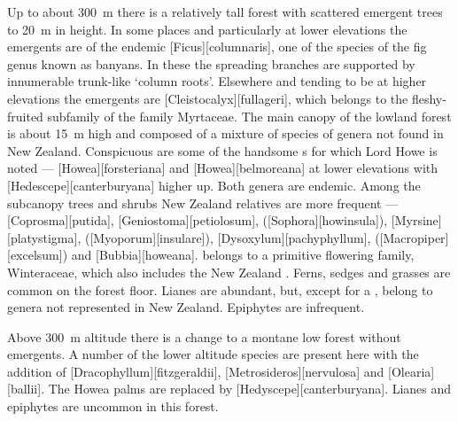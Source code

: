 Up to about \SI{300}{\metre} there is a relatively tall forest with scattered emergent trees to \SI{20}{\metre} in height.
In some places and particularly at lower elevations the emergents are of the endemic [Ficus][columnaris], one of the species of the fig genus known as banyans.
In these the spreading branches are supported by innumerable trunk-like `column roots'.
Elsewhere and tending to be at higher elevations the emergents are [Cleistocalyx][fullageri], which belongs to the fleshy-fruited subfamily of the family Myrtaceae.
The main canopy of the lowland forest is about \SI{15}{\metre} high and composed of a mixture of species of genera not found in New Zealand.
Conspicuous are some of the handsome s for which Lord Howe is noted --- [Howea][forsteriana] and [Howea][belmoreana] at lower elevations with [Hedescepe][canterburyana] higher up.
Both genera are endemic.
Among the subcanopy trees and shrubs New Zealand relatives are more frequent --- [Coprosma][putida], [Geniostoma][petiolosum],  ([Sophora][howinsula]), [Myrsine][platystigma],  ([Myoporum][insulare]), [Dysoxylum][pachyphyllum],  ([Macropiper][excelsum]) and [Bubbia][howeana].
 belongs to a primitive flowering family, Winteraceae, which also includes the New Zealand .
Ferns, sedges and grasses are common on the forest floor.
Lianes are abundant, but, except for a , belong to genera not represented in New Zealand.
Epiphytes are infrequent.

Above \SI{300}{\metre} altitude there is a change to a montane low forest without emergents.
A number of the lower altitude species are present here with the addition of [Dracophyllum][fitzgeraldii], [Metrosideros][nervulosa] and [Olearia][ballii].
The Howea palms are replaced by [Hedyscepe][canterburyana].
Lianes and epiphytes are uncommon in this forest.

